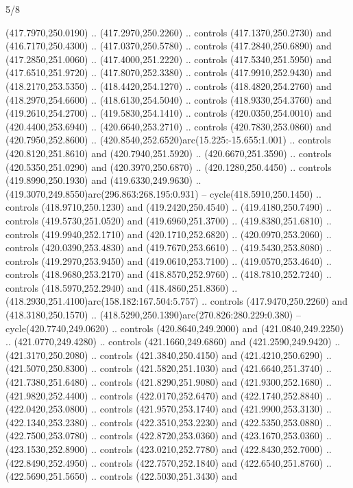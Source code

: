 \begin{flagdescription}{5/8}
\begin{scope}[xshift=0.5\flaglength,yshift=0.5\flagwidth,scale=\flagwidth/475.63]
\begin{scope}[y=0.8pt, x=0.8pt, yscale=-1, xscale=1,shift={(-450,-300)}]
\begin{scope}[cm={{1.0,0.0,0.0,1.0,(-0.0002,0.12556)}},cm={{1.0,0.0,0.0,1.0,(0.00179,0.0)}}]
\begin{scope}[cm={{1.00926,0.0,0.0,1.00926,(-3.1541,-2.47648)}}]
  (417.7970,250.0190) .. (417.2970,250.2260) .. controls (417.1370,250.2730) and
  (416.7170,250.4300) .. (417.0370,250.5780) .. controls (417.2840,250.6890) and
  (417.2850,251.0060) .. (417.4000,251.2220) .. controls (417.5340,251.5950) and
  (417.6510,251.9720) .. (417.8070,252.3380) .. controls (417.9910,252.9430) and
  (418.2170,253.5350) .. (418.4420,254.1270) .. controls (418.4820,254.2760) and
  (418.2970,254.6600) .. (418.6130,254.5040) .. controls (418.9330,254.3760) and
  (419.2610,254.2700) .. (419.5830,254.1410) .. controls (420.0350,254.0010) and
  (420.4400,253.6940) .. (420.6640,253.2710) .. controls (420.7830,253.0860) and
  (420.7950,252.8600) .. (420.8540,252.6520)arc(15.225:-15.655:1.001) ..
  controls (420.8120,251.8610) and (420.7940,251.5920) .. (420.6670,251.3590) ..
  controls (420.5350,251.0290) and (420.3970,250.6870) .. (420.1280,250.4450) ..
  controls (419.8990,250.1930) and (419.6330,249.9630) ..
  (419.3070,249.8550)arc(296.863:268.195:0.931) -- cycle(418.5910,250.1450) ..
  controls (418.9710,250.1230) and (419.2420,250.4540) .. (419.4180,250.7490) ..
  controls (419.5730,251.0520) and (419.6960,251.3700) .. (419.8380,251.6810) ..
  controls (419.9940,252.1710) and (420.1710,252.6820) .. (420.0970,253.2060) ..
  controls (420.0390,253.4830) and (419.7670,253.6610) .. (419.5430,253.8080) ..
  controls (419.2970,253.9450) and (419.0610,253.7100) .. (419.0570,253.4640) ..
  controls (418.9680,253.2170) and (418.8570,252.9760) .. (418.7810,252.7240) ..
  controls (418.5970,252.2940) and (418.4860,251.8360) ..
  (418.2930,251.4100)arc(158.182:167.504:5.757) .. controls (417.9470,250.2260)
  and (418.3180,250.1570) .. (418.5290,250.1390)arc(270.826:280.229:0.380) --
  cycle(420.7740,249.0620) .. controls (420.8640,249.2000) and
  (421.0840,249.2250) .. (421.0770,249.4280) .. controls (421.1660,249.6860) and
  (421.2590,249.9420) .. (421.3170,250.2080) .. controls (421.3840,250.4150) and
  (421.4210,250.6290) .. (421.5070,250.8300) .. controls (421.5820,251.1030) and
  (421.6640,251.3740) .. (421.7380,251.6480) .. controls (421.8290,251.9080) and
  (421.9300,252.1680) .. (421.9820,252.4400) .. controls (422.0170,252.6470) and
  (422.1740,252.8840) .. (422.0420,253.0800) .. controls (421.9570,253.1740) and
  (421.9900,253.3130) .. (422.1340,253.2380) .. controls (422.3510,253.2230) and
  (422.5350,253.0880) .. (422.7500,253.0780) .. controls (422.8720,253.0360) and
  (423.1670,253.0360) .. (423.1530,252.8900) .. controls (423.0210,252.7780) and
  (422.8430,252.7000) .. (422.8490,252.4950) .. controls (422.7570,252.1840) and
  (422.6540,251.8760) .. (422.5690,251.5650) .. controls (422.5030,251.3430) and

\end{scope}
\end{scope}
\end{scope}
\end{scope}
\end{flagdescription}
